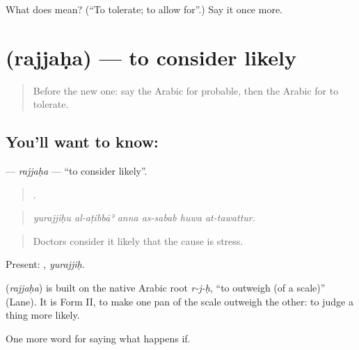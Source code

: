 \begin{tcolorbox}[breakable,colback=teal!4,colframe=teal!35!black,title={Before you move on}]
What does  mean? (\textquotedblleft{}To tolerate; to allow for\textquotedblright{}.) Say it once more.
\end{tcolorbox}
\section[\texorpdfstring{\ar{رجح} (rajjaḥa)}{رجح (rajjaḥa)}]{ (rajjaḥa) — to consider likely}

\label{lesson:AR-C401-rajjaha}



\begin{quote}
Before the new one: say the Arabic for probable, then the Arabic for to tolerate.
\end{quote}

\subsection*{You'll want to know: }
\textbf{} — \emph{rajjaḥa} — \textquotedblleft{}to consider likely\textquotedblright{}.

\begin{quote}
     .
\end{quote}

\begin{quote}
\emph{yurajjiḥu al-aṭibbāʾ anna as-sabab huwa at-tawattur.}
\end{quote}

\begin{quote}
Doctors consider it likely that the cause is stress.
\end{quote}

Present: , \emph{yurajjiḥ}.

\begin{cousinweb}
\textbf{} (\emph{rajjaḥa}) is built on the native Arabic root \emph{r-j-ḥ}, \textquotedblleft{}to outweigh (of a scale)\textquotedblright{} (Lane). It is Form II, to make one pan of the scale outweigh the other: to judge a thing more likely.
\end{cousinweb}

\begin{grammarlens}[title={What you've built}]
One more word for saying what happens if.
\end{grammarlens}

